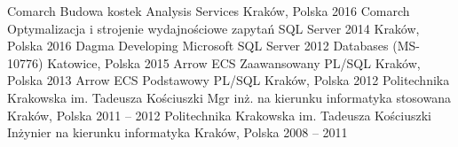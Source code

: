 

\begin{cventries}
	\cventry
		{Comarch}
		{Budowa kostek Analysis Services}
		{Kraków, Polska}
		{2016}
		{}
	\cventry
		{Comarch}
		{Optymalizacja i strojenie wydajnościowe zapytań SQL Server 2014}
		{Kraków, Polska}
		{2016}
		{}
	\cventry
		{Dagma}
		{Developing Microsoft SQL Server 2012 Databases (MS-10776)}
		{Katowice, Polska}
		{2015}
		{}
	\cventry
		{Arrow ECS}
		{Zaawansowany PL/SQL}
		{Kraków, Polska}
		{2013}
		{}
	\cventry
		{Arrow ECS}
		{Podstawowy PL/SQL}
		{Kraków, Polska}
		{2012}
		{}
	\cventry
		{Politechnika Krakowska im. Tadeusza Kościuszki}
		{Mgr inż. na kierunku informatyka stosowana}
		{Kraków, Polska} 
		{2011 -- 2012}
		{}
	\cventry
		{Politechnika Krakowska im. Tadeusza Kościuszki}
		{Inżynier na kierunku informatyka}
		{Kraków, Polska}
		{2008 -- 2011} 
		{}
\end{cventries}
